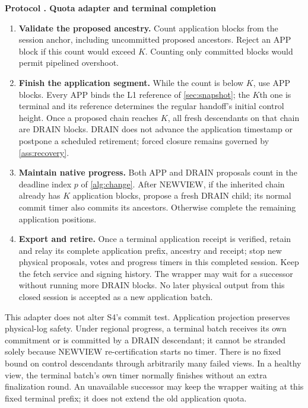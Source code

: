 \documentclass[11pt,a4paper,onecolumn]{article}
\newcounter{protocol}
\newenvironment{protocol}[2]{\refstepcounter{protocol}\label{#1}
\begin{mdframed}[nobreak=true,linewidth=.6pt,skipabove=9pt,skipbelow=9pt,
innertopmargin=7pt,innerbottommargin=7pt]\small
\noindent\textbf{Protocol \theprotocol. #2}\par\smallskip}{\end{mdframed}}
\begin{document}
\begin{protocol}{alg:drain}{Quota adapter and terminal completion}
\begin{enumerate}[label=\textbf{Q\arabic*.}]
\item \textbf{Validate the proposed ancestry.} Count application blocks
from the session anchor, including uncommitted proposed ancestors. Reject
an APP block if this count would exceed $K$. Counting only committed
blocks would permit pipelined overshoot.
\item \textbf{Finish the application segment.} While the count is below
$K$, use APP blocks. Every APP binds the L1 reference of
\cref{sec:snapshot}; the $K$th one is terminal and its reference determines
the regular handoff's initial control height. Once a proposed chain reaches $K$,
all fresh descendants on that chain are DRAIN blocks.
DRAIN does not advance the application timestamp or postpone a scheduled
retirement; forced closure remains governed by \cref{ass:recovery}.
\item \textbf{Maintain native progress.} Both APP and DRAIN proposals
count in the deadline index $p$ of \cref{alg:change}. After NEWVIEW,
if the inherited chain already has $K$ application blocks, propose a
fresh DRAIN child; its normal commit timer also commits its ancestors.
Otherwise complete the remaining application positions.
\item \textbf{Export and retire.} Once a terminal application receipt
is verified, retain and relay its complete application prefix, ancestry
and receipt; stop new physical proposals, votes and progress timers in this
completed session. Keep the fetch service and signing history. The wrapper
may wait for a successor without running more DRAIN blocks. No later physical output
from this closed session is accepted as a new application batch.
\end{enumerate}
\end{protocol}
This adapter does not alter S4's commit test. Application projection
preserves physical-log safety. Under regional progress, a terminal batch
receives its own commitment or is committed by a DRAIN descendant; it
cannot be stranded solely because NEWVIEW re-certification starts no timer.
There is no fixed bound on control descendants through arbitrarily many
failed views. In a healthy view, the terminal batch's own timer normally
finishes without an extra finalization round. An unavailable successor
may keep the wrapper waiting at this fixed terminal prefix; it does not
extend the old application quota.
\end{document}

